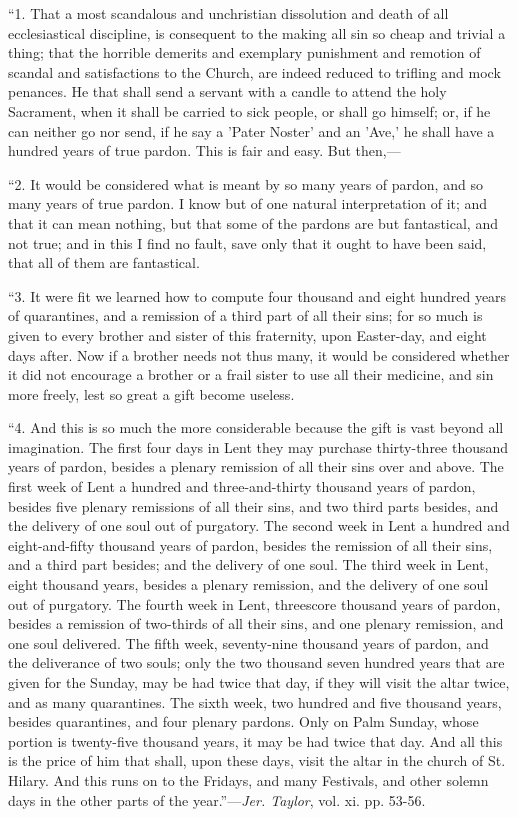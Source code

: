 ``1. That a most scandalous and unchristian
dissolution and death of all ecclesiastical discipline, is consequent
to the making all sin so cheap and trivial a thing; that the horrible
demerits and exemplary punishment and remotion of scandal and
satisfactions to the Church, are indeed reduced to trifling and mock
penances. He that shall send a servant with a candle to attend the
holy Sacrament, when it shall be carried to sick people, or shall go
himself; or, if he can neither go nor send, if he say a 'Pater Noster'
and an 'Ave,' he shall have a hundred years of true pardon. This is
fair and easy. But then,—

``2. It would be considered what is meant by so
many years of pardon, and so many years of true pardon. I know
but of one natural interpretation of it; and that it can mean nothing,
but that some of the pardons are but fantastical, and not true; and in
this I find no fault, save only that it ought to have been said, that
all of them are fantastical.

``3. It were fit we learned how to compute four
thousand and eight hundred years of quarantines, and a remission of a
third part of all their sins; for so much is given to every brother
and sister of this fraternity, upon Easter-day, and eight days after.
Now if a brother needs not thus many, it would be considered whether
it did not encourage a brother or a frail sister to use all their
medicine, and sin more freely, lest so great a gift become useless.

``4. And this is so much the more considerable
because the gift is vast beyond all imagination. The first four days
in Lent they may purchase thirty-three thousand years of pardon,
besides a plenary remission of all their sins over and above. The
first week of Lent a hundred and three-and-thirty thousand years of
pardon, besides five plenary remissions of all their sins, and two
third parts besides, and the delivery of one soul out of purgatory.
The second week in Lent a hundred and eight-and-fifty thousand years
of pardon, besides the remission of all their sins, and a third part
besides; and the delivery of one soul. The third week in Lent, eight
thousand years, besides a plenary remission, and the delivery of one
soul out of purgatory. The fourth week in Lent, threescore thousand
years of pardon, besides a remission of two-thirds of all their sins,
and one plenary remission, and one soul delivered. The fifth week,
seventy-nine thousand years of pardon, and the deliverance of two
souls; only the two thousand seven hundred years that are given for
the Sunday, may be had twice that day, if they will visit the altar
twice, and as many quarantines. The sixth week, two hundred and five
thousand years, besides quarantines, and four plenary pardons. Only on
Palm Sunday, whose portion is twenty-five thousand years, it may be
had twice that day. And all this is the price of him that shall, upon
these days, visit the altar in the church of St. Hilary. And this runs
on to the Fridays, and many Festivals, and other solemn days in the
other parts of the year.''—\emph{Jer. Taylor}, vol. xi. pp.
53-56.

